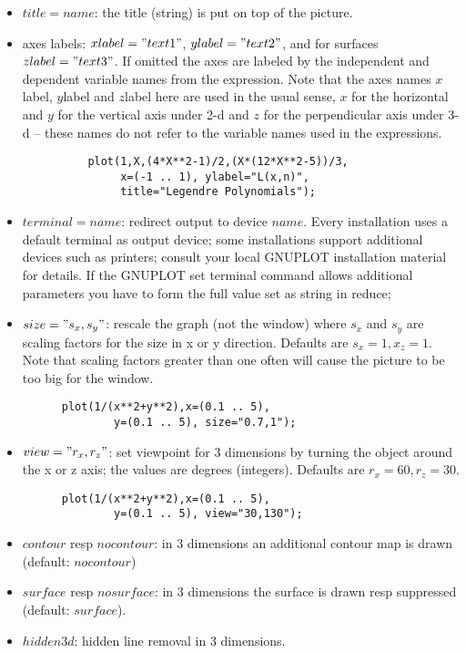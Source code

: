 \begin{itemize}
\item $title=name$: the title (string) is put on top
     of the picture. 

\item axes labels: $xlabel="text1"$, $ylabel="text2"$, and for
  surfaces $zlabel="text3"$. If omitted the axes are labeled
  by the independent and dependent variable names from the
  expression. Note that the axes names $x$label, $y$label and
  $z$label here are used in the usual sense, $x$ for the 
  horizontal and $y$ for the vertical axis under 2-d and
  $z$ for the perpendicular axis under 3-d -- these names
  do not refer to the variable names used in the expressions.

\begin{verbatim}
          plot(1,X,(4*X**2-1)/2,(X*(12*X**2-5))/3,
               x=(-1 .. 1), ylabel="L(x,n)",
               title="Legendre Polynomials");
\end{verbatim}

\item $terminal=name$: redirect output to device $name$.
     Every installation uses a default terminal as output
     device; some installations support additional
     devices such as printers; consult your local
     GNUPLOT installation material for details.
     If the GNUPLOT set terminal command allows
     additional parameters you have to form the full
     value set as string in {\small reduce};
\item $size="s_x,s_y"$: rescale the graph (not the
      window) where $s_x$ and $s_y$ are scaling
     factors for the size in x or y
     direction. Defaults are $s_x=1,x_z=1$.
     Note that scaling factors greater than one
     often will cause the picture to be too big for
     the window.
\begin{verbatim}
      plot(1/(x**2+y**2),x=(0.1 .. 5),
              y=(0.1 .. 5), size="0.7,1");
\end{verbatim}
\item $view="r_x,r_z"$: set viewpoint for 3 dimensions 
     by turning the object around the x or z axis;
     the values are degrees (integers).
Defaults are $r_x=60,r_z=30$.
\begin{verbatim}
      plot(1/(x**2+y**2),x=(0.1 .. 5),
              y=(0.1 .. 5), view="30,130");
\end{verbatim}
\item  $contour$ resp $nocontour$: in 3 dimensions an 
       additional contour map is drawn (default: $nocontour$)
\item $surface$ resp $nosurface$: in 3 dimensions the
       surface is drawn resp suppressed (default: $surface$).
\item $hidden3d$: hidden line removal in 3 dimensions.
\end{itemize}



